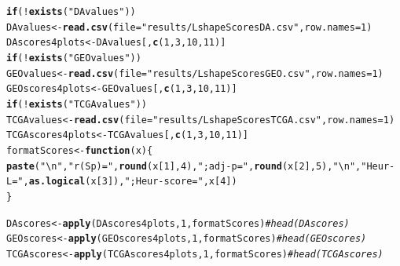 \documentclass[a4paper,10pt]{article}\usepackage[]{graphicx}\usepackage[]{color}
\makeatletter
\newcommand{\hlnum}[1]{\textcolor[rgb]{0.686,0.059,0.569}{#1}}%
\newcommand{\hlstr}[1]{\textcolor[rgb]{0.192,0.494,0.8}{#1}}%
\newcommand{\hlcom}[1]{\textcolor[rgb]{0.678,0.584,0.686}{\textit{#1}}}%
\newcommand{\hlopt}[1]{\textcolor[rgb]{0,0,0}{#1}}%
\newcommand{\hlstd}[1]{\textcolor[rgb]{0.345,0.345,0.345}{#1}}%
\newcommand{\hlkwa}[1]{\textcolor[rgb]{0.161,0.373,0.58}{\textbf{#1}}}%
\newcommand{\hlkwb}[1]{\textcolor[rgb]{0.69,0.353,0.396}{#1}}%
\newcommand{\hlkwc}[1]{\textcolor[rgb]{0.333,0.667,0.333}{#1}}%
\newcommand{\hlkwd}[1]{\textcolor[rgb]{0.737,0.353,0.396}{\textbf{#1}}}%
\newenvironment{kframe}{%
 \def\at@end@of@kframe{}%
 \ifinner\ifhmode%
  \def\at@end@of@kframe{\end{minipage}}%
  \begin{minipage}{\columnwidth}%
 \fi\fi%
 \def\FrameCommand##1{\hskip\@totalleftmargin \hskip-\fboxsep
 \colorbox{shadecolor}{##1}\hskip-\fboxsep
     \hskip-\linewidth \hskip-\@totalleftmargin \hskip\columnwidth}%
 \MakeFramed {\advance\hsize-\width
   \@totalleftmargin\z@ \linewidth\hsize
   \@setminipage}}%
 {\par\unskip\endMakeFramed%
 \at@end@of@kframe}
\newenvironment{knitrout}{}{} %
\makeatother
\begin{document}
\begin{knitrout}
\color{fgcolor}\begin{kframe}
\begin{alltt}
\hlkwa{if} \hlstd{(}\hlopt{!}\hlkwd{exists}\hlstd{(}\hlstr{"DAvalues"}\hlstd{))}
  \hlstd{DAvalues}\hlkwb{<-} \hlkwd{read.csv}\hlstd{(}\hlkwc{file}\hlstd{=}\hlstr{"results/LshapeScoresDA.csv"}\hlstd{,} \hlkwc{row.names} \hlstd{=} \hlnum{1}\hlstd{)}
\hlstd{DAscores4plots} \hlkwb{<-} \hlstd{DAvalues[,}\hlkwd{c}\hlstd{(}\hlnum{1}\hlstd{,}\hlnum{3}\hlstd{,}\hlnum{10}\hlstd{,}\hlnum{11}\hlstd{)]}
\hlkwa{if} \hlstd{(}\hlopt{!}\hlkwd{exists}\hlstd{(}\hlstr{"GEOvalues"}\hlstd{))}
  \hlstd{GEOvalues}\hlkwb{<-} \hlkwd{read.csv}\hlstd{(}\hlkwc{file}\hlstd{=}\hlstr{"results/LshapeScoresGEO.csv"}\hlstd{,} \hlkwc{row.names} \hlstd{=} \hlnum{1}\hlstd{)}
\hlstd{GEOscores4plots} \hlkwb{<-} \hlstd{GEOvalues[,}\hlkwd{c}\hlstd{(}\hlnum{1}\hlstd{,}\hlnum{3}\hlstd{,}\hlnum{10}\hlstd{,}\hlnum{11}\hlstd{)]}
\hlkwa{if} \hlstd{(}\hlopt{!}\hlkwd{exists}\hlstd{(}\hlstr{"TCGAvalues"}\hlstd{))}
  \hlstd{TCGAvalues}\hlkwb{<-} \hlkwd{read.csv}\hlstd{(}\hlkwc{file}\hlstd{=}\hlstr{"results/LshapeScoresTCGA.csv"}\hlstd{,} \hlkwc{row.names} \hlstd{=} \hlnum{1}\hlstd{)}
\hlstd{TCGAscores4plots} \hlkwb{<-} \hlstd{TCGAvalues[,}\hlkwd{c}\hlstd{(}\hlnum{1}\hlstd{,}\hlnum{3}\hlstd{,}\hlnum{10}\hlstd{,}\hlnum{11}\hlstd{)]}
\hlstd{formatScores} \hlkwb{<-} \hlkwa{function}\hlstd{(}\hlkwc{x}\hlstd{)\{}
  \hlkwd{paste}\hlstd{(} \hlstr{"\textbackslash{}n"}\hlstd{,} \hlstr{"r(Sp)="}\hlstd{,} \hlkwd{round}\hlstd{(x[}\hlnum{1}\hlstd{],} \hlnum{4}\hlstd{) ,} \hlstr{"; adj-p="}\hlstd{,} \hlkwd{round}\hlstd{(x[}\hlnum{2}\hlstd{],}\hlnum{5}\hlstd{),}\hlstr{"\textbackslash{}n"}\hlstd{,} \hlstr{"Heur-L="}\hlstd{,} \hlkwd{as.logical}\hlstd{(x[}\hlnum{3}\hlstd{]),} \hlstr{"; Heur-score="}\hlstd{, x[}\hlnum{4}\hlstd{])}
  \hlstd{\}}

\hlstd{DAscores}\hlkwb{<-} \hlkwd{apply}\hlstd{(DAscores4plots,}\hlnum{1}\hlstd{, formatScores)} \hlcom{# head(DAscores)}
\hlstd{GEOscores}\hlkwb{<-} \hlkwd{apply}\hlstd{(GEOscores4plots,}\hlnum{1}\hlstd{, formatScores)} \hlcom{# head(GEOscores)}
\hlstd{TCGAscores}\hlkwb{<-} \hlkwd{apply}\hlstd{(TCGAscores4plots,}\hlnum{1}\hlstd{, formatScores)} \hlcom{# head(TCGAscores)}
\end{alltt}
\end{kframe}
\end{knitrout}
\end{document}
